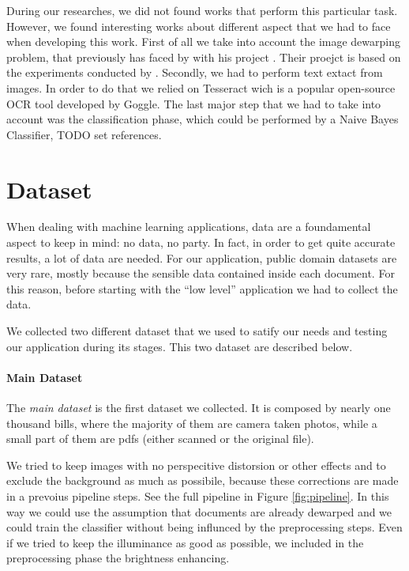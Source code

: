 \documentclass[10pt,twocolumn,letterpaper]{article}
\begin{document}
During our researches, we did not found works that perform this
particular task. However, we found interesting works about different
aspect that we had to face when developing this work.  First of all we
take into account the image dewarping problem, that previously has
faced by \cite{Improvingcamera-based} with his project
\cite{mobile-ocr}. Their proejct is based on the experiments conducted
by \cite{recoveringhomography}.  Secondly, we had to perform text
extact from images. In order to do that we relied on Tesseract
\cite{Tesseract} wich is a popular open-source OCR tool developed by
Goggle. The last major step that we had to take into account was the
classification phase, which could be performed by a Naive Bayes
Classifier, TODO set references.

\section{Dataset}
\label{sec:dataset}

When dealing with machine learning applications, data are a
foundamental aspect to keep in mind: no data, no party. In fact, in
order to get quite accurate results, a lot of data are needed. For our
application, public domain datasets are very rare, mostly because the
sensible data contained inside each document. For this reason, before
starting with the ``low level'' application we had to collect the
data.

We collected two different dataset that we used to satify our needs
and testing our application during its stages. This two dataset are
described below.

\paragraph{Main Dataset}
\label{par:main-dataset}

The \emph{main dataset} is the first dataset we collected. It is
composed by nearly one thousand bills, where the majority of them are
camera taken photos, while a small part of them are pdfs (either
scanned or the original file).

We tried to keep images with no perspecitive distorsion or other
effects and to exclude the background as much as possibile, because
these corrections are made in a prevoius pipeline steps. See the full
pipeline in Figure \ref{fig:pipeline}.  In this way we could use the
assumption that documents are already dewarped and we could train the
classifier without being influnced by the preprocessing steps. Even if
we tried to keep the illuminance as good as possible, we included in
the preprocessing phase the brightness enhancing.
\end{document}

